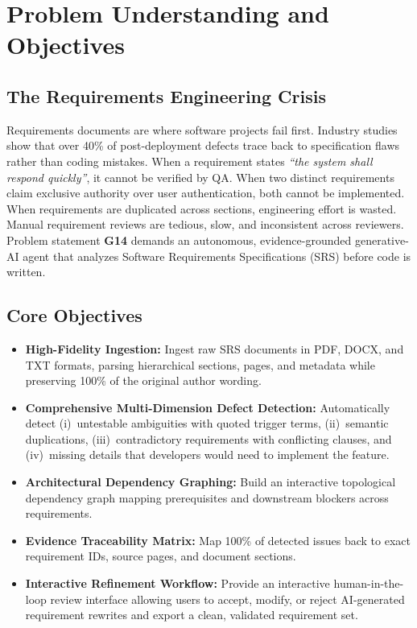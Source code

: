 \documentclass[11pt,a4paper]{article}
\begin{document}
\vspace{6pt}

\section{Problem Understanding and Objectives}

\subsection{The Requirements Engineering Crisis}
Requirements documents are where software projects fail first. Industry studies show that over 40\% of post-deployment defects trace back to specification flaws rather than coding mistakes. When a requirement states \emph{``the system shall respond quickly''}, it cannot be verified by QA. When two distinct requirements claim exclusive authority over user authentication, both cannot be implemented. When requirements are duplicated across sections, engineering effort is wasted. 
Manual requirement reviews are tedious, slow, and inconsistent across reviewers. Problem statement \textbf{G14} demands an autonomous, evidence-grounded generative-AI agent that analyzes Software Requirements Specifications (SRS) before code is written.

\subsection{Core Objectives}
\begin{itemize}
  \item \textbf{High-Fidelity Ingestion:} Ingest raw SRS documents in PDF, DOCX, and TXT formats, parsing hierarchical sections, pages, and metadata while preserving 100\% of the original author wording.
  \item \textbf{Comprehensive Multi-Dimension Defect Detection:} Automatically detect (i)~untestable ambiguities with quoted trigger terms, (ii)~semantic duplications, (iii)~contradictory requirements with conflicting clauses, and (iv)~missing details that developers would need to implement the feature.
  \item \textbf{Architectural Dependency Graphing:} Build an interactive topological dependency graph mapping prerequisites and downstream blockers across requirements.
  \item \textbf{Evidence Traceability Matrix:} Map 100\% of detected issues back to exact requirement IDs, source pages, and document sections.
  \item \textbf{Interactive Refinement Workflow:} Provide an interactive human-in-the-loop review interface allowing users to accept, modify, or reject AI-generated requirement rewrites and export a clean, validated requirement set.
\end{itemize}
\end{document}
